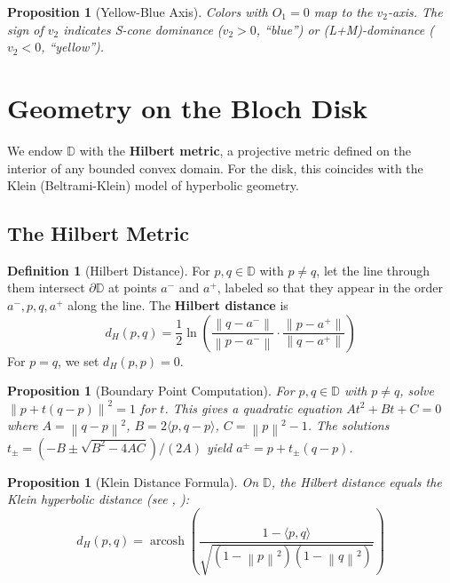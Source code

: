\documentclass[11pt]{article}
\theoremstyle{plain}
\newtheorem{proposition}[theorem]{Proposition}
\theoremstyle{definition}
\newtheorem{definition}[theorem]{Definition}
\theoremstyle{remark}
\newcommand{\D}{\mathbb{D}}
\newcommand{\norm}[1]{\left\lVert #1 \right\rVert}
\newcommand{\inner}[2]{\langle #1, #2 \rangle}
\DeclareMathOperator{\arcosh}{arcosh}
\begin{document}
\begin{proposition}[Yellow-Blue Axis]
\label{prop:yb-axis}
Colors with $O_1 = 0$ map to the $v_2$-axis. The sign of $v_2$ indicates S-cone dominance ($v_2 > 0$, ``blue'') or (L+M)-dominance ($v_2 < 0$, ``yellow'').
\end{proposition}

\section{Geometry on the Bloch Disk}
\label{sec:geometry}

We endow $\D$ with the \textbf{Hilbert metric}, a projective metric defined on the interior of any bounded convex domain. For the disk, this coincides with the Klein (Beltrami-Klein) model of hyperbolic geometry.

\subsection{The Hilbert Metric}

\begin{definition}[Hilbert Distance]
\label{def:hilbert}
For $p, q \in \D$ with $p \neq q$, let the line through them intersect $\partial \D$ at points $a^-$ and $a^+$, labeled so that they appear in the order $a^-, p, q, a^+$ along the line. The \textbf{Hilbert distance} is
\begin{equation}
\boxed{
d_H(p, q) = \frac{1}{2} \ln \left( \frac{\norm{q - a^-}}{\norm{p - a^-}} \cdot \frac{\norm{p - a^+}}{\norm{q - a^+}} \right)
}
\end{equation}
For $p = q$, we set $d_H(p, p) = 0$.
\end{definition}

\begin{proposition}[Boundary Point Computation]
For $p, q \in \D$ with $p \neq q$, solve $\norm{p + t(q-p)}^2 = 1$ for $t$. This gives a quadratic equation $At^2 + Bt + C = 0$ where $A = \norm{q-p}^2$, $B = 2\inner{p}{q-p}$, $C = \norm{p}^2 - 1$. The solutions $t_\pm = (-B \pm \sqrt{B^2 - 4AC})/(2A)$ yield $a^\pm = p + t_\pm(q-p)$.
\end{proposition}

\begin{proposition}[Klein Distance Formula]
\label{prop:klein-formula}
On $\D$, the Hilbert distance equals the Klein hyperbolic distance (see \cite{Berthier2020}, \cite{Provenzi2020}):
\begin{equation}
\boxed{
d_H(p, q) = \arcosh\left( \frac{1 - \inner{p}{q}}{\sqrt{(1 - \norm{p}^2)(1 - \norm{q}^2)}} \right)
}
\end{equation}
\end{proposition}
\end{document}
